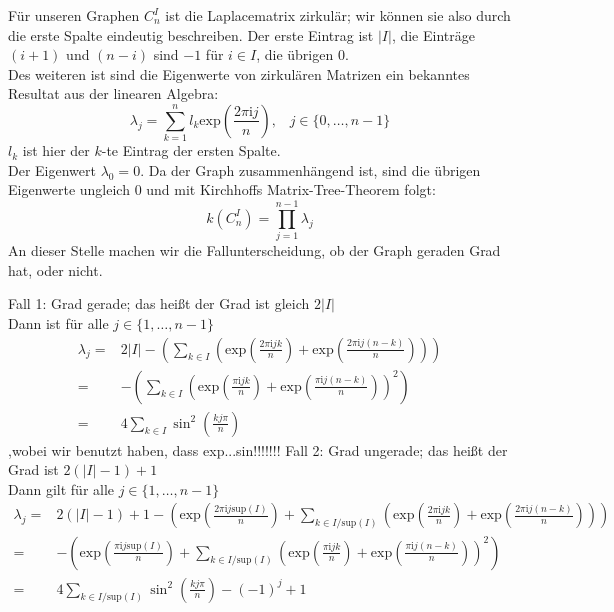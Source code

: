 Für unseren Graphen $C_n^I$ ist die Laplacematrix zirkulär; wir können sie also durch die erste Spalte eindeutig beschreiben. Der erste Eintrag ist $|I|$, die Einträge $(i+1)$  und $(n-i)$ sind $-1$ für $i \in I$, die übrigen $0$.\\
Des weiteren ist sind die Eigenwerte von zirkulären Matrizen ein bekanntes Resultat aus der linearen Algebra:
\begin{equation}
 \lambda_j = \sum_{k=1}^{n}l_k\mathrm{exp}{\left(\frac{2\pi \mathrm{i}j}{n}\right)}, \,\,\,\,\, {j\in\{0,\ldots,n-1\}}
\end{equation}
$l_k$ ist hier der $k$-te Eintrag der ersten Spalte.\\ 
Der Eigenwert $\lambda_0 = 0$. Da der Graph zusammenhängend ist, sind die übrigen Eigenwerte ungleich $0$ und mit Kirchhoffs Matrix-Tree-Theorem folgt:
\begin{equation}
 \mathit{k}(C_n^I)=\prod_{j=1}^{n-1} \lambda_j
\end{equation}
An dieser Stelle machen wir die Fallunterscheidung, ob der Graph geraden Grad hat, oder nicht.\\
\par %
\begingroup
\leftskip=20pt%
\rightskip=20pt
\noindent
Fall 1: Grad gerade; das heißt der Grad ist gleich $2|I|$\\
Dann ist für alle $j \in \{1,\ldots,n-1\}$
\begin{equation}
\begin{aligned}
 \lambda_j = {} & {2|I| - \left( \sum_{k\in I}\left(\mathrm{exp}{\left(\frac{2\pi \mathrm{i}jk}{n}\right)} + \mathrm{exp}{\left(\frac{2\pi \mathrm{i}j(n-k)}{n}\right)}\right)\right)}\\
 = {} &-\left( \sum_{k\in I}\left(\mathrm{exp}{\left(\frac{\pi \mathrm{i}jk}{n}\right)}+ \mathrm{exp}{\left(\frac{\pi \mathrm{i}j(n-k)}{n}\right)}\right)^2\right)\\
 ={} & 4\sum_{k\in I} \sin^2 \left( \frac{kj\pi}{n}\right)
 \end{aligned}
\end{equation}
,wobei wir benutzt haben, dass exp...sin!!!!!!!
Fall 2: Grad ungerade; das heißt der Grad ist $2(|I|-1) + 1$\\
Dann gilt für alle $j \in \{1,\ldots,n-1\}$
\small
\begin{equation}
\begin{aligned}
 \lambda_j = {} & { 2(|I|-1)+1 - \left(\mathrm{exp}{\left(\frac{2\pi \mathrm{i}j \mathrm{sup}(I)}{n}\right)}+ \sum_{k\in I/\mathrm{sup}(I)}\left(\mathrm{exp}{\left(\frac{2\pi \mathrm{i}jk}{n}\right)}+ \mathrm{exp}{\left(\frac{2\pi \mathrm{i}j(n-k)}{n}\right)}\right)\right)}\\
  = {} &-\left(\mathrm{exp}{\left(\frac{\pi \mathrm{i}j \mathrm{sup}(I)}{n}\right)} +\sum_{k\in I/\mathrm{sup}(I)}\left(\mathrm{exp}{\left(\frac{\pi \mathrm{i}jk}{n}\right)}+ \mathrm{exp}{\left(\frac{\pi \mathrm{i}j(n-k)}{n}\right)}\right)^2\right)\\
  = {} & 4\sum_{k\in I/\mathrm{sup}(I)} \sin^2 \left( \frac{kj\pi}{n}\right)-(-1)^j+1
 \end{aligned}
\end{equation}
